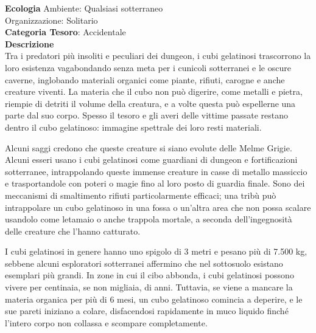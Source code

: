\begin{multicols}{2}
{\textbf{Ecologia}
Ambiente: Qualsiasi sotterraneo\\
Organizzazione: Solitario\\
\textbf{Categoria Tesoro}: Accidentale\\
\textbf{Descrizione}\\
Tra i predatori più insoliti e peculiari dei dungeon, i cubi gelatinosi trascorrono la loro esistenza vagabondando senza meta per i cunicoli sotterranei e le oscure caverne, inglobando materiali organici come piante, rifiuti, carogne e anche creature viventi. La materia che il cubo non può digerire, come metalli e pietra, riempie di detriti il volume della creatura, e a volte questa può espellerne una parte dal suo corpo. Spesso il tesoro e gli averi delle vittime passate restano dentro il cubo gelatinoso: immagine spettrale dei loro resti materiali.

Alcuni saggi credono che queste creature si siano evolute delle Melme Grigie. Alcuni esseri usano i cubi gelatinosi come guardiani di dungeon e fortificazioni sotterranee, intrappolando queste immense creature in casse di metallo massiccio e trasportandole con poteri o magie fino al loro posto di guardia finale. Sono dei meccanismi di smaltimento rifiuti particolarmente efficaci; una tribù può intrappolare un cubo gelatinoso in una fossa o un'altra area che non possa scalare usandolo come letamaio o anche trappola mortale, a seconda dell'ingegnosità delle creature che l'hanno catturato.

I cubi gelatinosi in genere hanno uno spigolo di 3 metri e pesano più di 7.500 kg, sebbene alcuni esploratori sotterranei affermino che nel sottosuolo esistano esemplari più grandi. In zone in cui il cibo abbonda, i cubi gelatinosi possono vivere per centinaia, se non migliaia, di anni. Tuttavia, se viene a mancare la materia organica per più di 6 mesi, un cubo gelatinoso comincia a deperire, e le sue pareti iniziano a colare, disfacendosi rapidamente in muco liquido finché l'intero corpo non collassa e scompare completamente.

}
\end{multicols}
